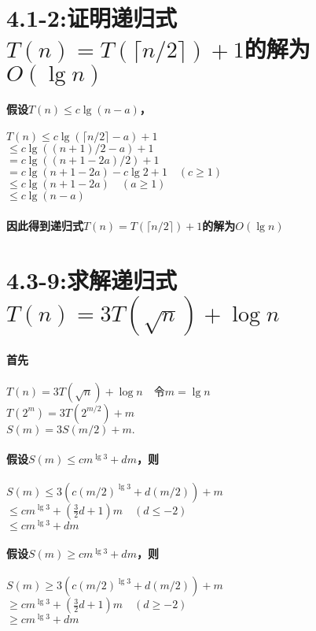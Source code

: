 \documentclass[a4paper]{article}
\begin{document}
\section{4.1-2:证明递归式$T(n)=T(\lceil n/2 \rceil)+1$的解为$O(\lg n)$}
\paragraph{假设$T(n)\leq c\lg (n-a)$，}
\begin{center}
    $T(n)\leq c\lg (\lceil n/2 \rceil-a)+1$\\
    $\leq c\lg ((n+1)/2-a)+1$\\
    $= c\lg ((n+1-2a)/2)+1$\\
    $= c\lg (n+1-2a)-c\lg 2+1 \quad (c\geq 1)$\\
    $\leq c\lg (n+1-2a) \quad (a\geq 1)$\\
    $\leq c\lg (n-a)$\\
\end{center}
\paragraph{因此得到递归式$T(n)=T(\lceil n/2 \rceil)+1$的解为$O(\lg n)$}
\section{4.3-9:求解递归式$T(n)=3T(\sqrt{n})+\log n$}
\paragraph{首先}
\begin{center}
    $T(n)=3T(\sqrt{n})+\log n \quad $令$m=\lg n$\\
    $T(2^m)=3T(2^{m/2})+m$\\
    $S(m)=3S(m/2)+m.$\\
\end{center}
\paragraph{假设$S(m) \leq cm^{\lg 3}+dm$，则}
\begin{center}
    $S(m)\leq 3(c(m/2)^{\lg 3}+d(m/2))+m$\\
    $\leq cm^{\lg 3}+(\frac{3}{2}d+1)m \quad (d\leq -2)$\\
    $\leq cm^{\lg 3}+dm$\\
\end{center}
\paragraph{假设$S(m) \geq cm^{\lg 3}+dm$，则}
\begin{center}
    $S(m)\geq 3(c(m/2)^{\lg 3}+d(m/2))+m$\\
    $\geq cm^{\lg 3}+(\frac{3}{2}d+1)m \quad (d\geq -2)$\\
    $\geq cm^{\lg 3}+dm$\\
\end{center}
\end{document}

